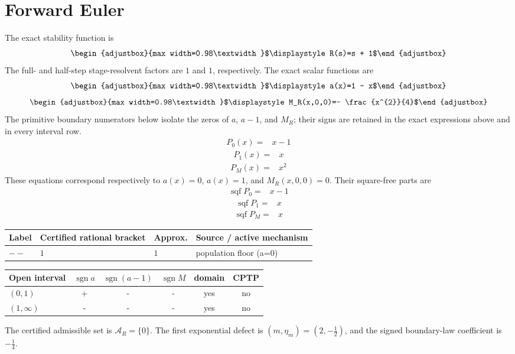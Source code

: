 \section{Forward Euler}
The exact stability function is
\[\begin{adjustbox}{max width=0.98\textwidth}$\displaystyle R(s)=s + 1$\end{adjustbox}\]
The full- and half-step stage-resolvent factors are $1$ and $1$, respectively.
The exact scalar functions are
\[\begin{adjustbox}{max width=0.98\textwidth}$\displaystyle a(x)=1 - x$\end{adjustbox}\]
\[\begin{adjustbox}{max width=0.98\textwidth}$\displaystyle M_R(x,0,0)=- \frac{x^{2}}{4}$\end{adjustbox}\]
The primitive boundary numerators below isolate the zeros of $a$, $a-1$, and $M_R$; their signs are retained in the exact expressions above and in every interval row.
\[\begin{aligned}
P_0(x)={}&x-1
\end{aligned}\]
\[\begin{aligned}
P_1(x)={}&x
\end{aligned}\]
\[\begin{aligned}
P_M(x)={}&x^{2}
\end{aligned}\]
These equations correspond respectively to $a(x)=0$, $a(x)=1$, and $M_R(x,0,0)=0$. Their square-free parts are
\[\begin{aligned}
\operatorname{sqf}P_0={}&x-1
\end{aligned}\]
\[\begin{aligned}
\operatorname{sqf}P_1={}&x
\end{aligned}\]
\[\begin{aligned}
\operatorname{sqf}P_M={}&x
\end{aligned}\]
\begin{center}
\begin{tabularx}{\textwidth}{@{}l l l X@{}}
\toprule
Label & Certified rational bracket & Approx. & Source / active mechanism \\
\midrule
$--$ & $1$ & $1$ & population floor (a=0) \\
\bottomrule
\end{tabularx}
\end{center}
\begin{center}
\begin{tabular}{@{}l c c c c c@{}}
\toprule
Open interval & $\operatorname{sgn}a$ & $\operatorname{sgn}(a-1)$ & $\operatorname{sgn}M$ & domain & CPTP \\
\midrule
$(0,1)$ & + & - & - & yes & no \\
$(1,\infty)$ & - & - & - & yes & no \\
\bottomrule
\end{tabular}
\end{center}
The certified admissible set is $\mathcal A_R=\{0\}$. The first exponential defect is $(m,\eta_m)=(2,- \frac{1}{2})$, and the signed boundary-law coefficient is $- \frac{1}{4}$.
